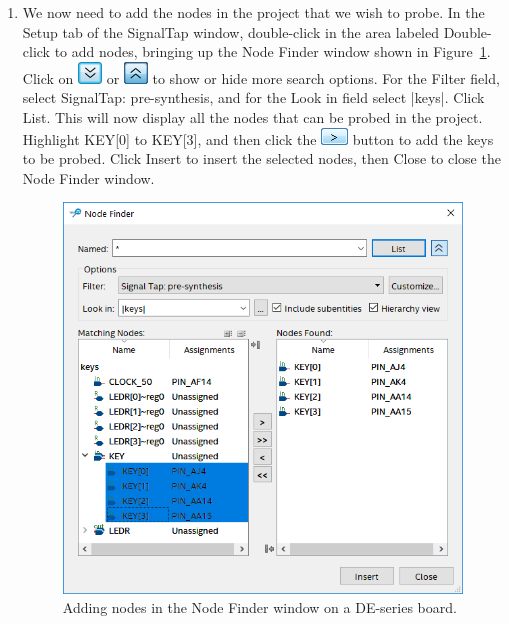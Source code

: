 \documentclass[11pt, twoside, pdftex]{article}
\begin{document}
\begin{enumerate}
\item We now need to add the nodes in the project that we wish to probe. In the Setup tab of the SignalTap window, double-click
in the area labeled  {\sf Double-click to add nodes}, bringing up the Node Finder window 
shown in Figure~\ref{fig:8}. Click on \includegraphics[scale=0.7]{figures/icon3.png} or \includegraphics[scale=0.7]{figures/icon6.png} to show or hide more search options. 
For the {\sf Filter} field, select {\sf SignalTap: pre-synthesis}, and
for the {\sf Look in} field select {\sf |keys|}.
Click {\sf List}. This will now display all the nodes that can be probed in the project. 
Highlight KEY[0] to KEY[3], and then click the \includegraphics[scale=0.90]{figures/icon4.png} button to add the keys to be probed.
Click {\sf Insert} to insert the selected nodes, then {\sf Close} to close the Node Finder window.

\begin{figure}[H]
   \begin{center}
      \includegraphics[scale=0.6]{figures/figure8.png}
   \caption{Adding nodes in the Node Finder window on a DE-series board.} 
	 \label{fig:8}
	 \end{center}
\end{figure}


\end{enumerate}
\end{document}
